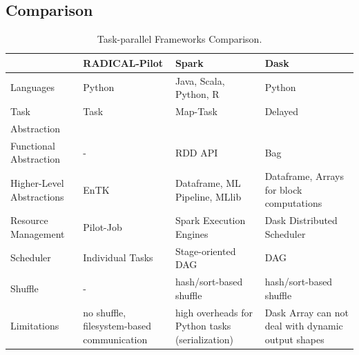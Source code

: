 
\subsection{Comparison}
\begin{table}[t]
    \begin{tabular}{@{}p{2.75cm}|p{3.25cm}p{3.25cm}p{3.25cm}@{}}
        \toprule
        &\textbf{RADICAL-Pilot} &
        \textbf{Spark} &
        \textbf{Dask} \\
        \midrule
        Languages &
        Python &
        Java, Scala, Python, R &
        Python\\
        Task &
        Task &
        Map-Task &
        Delayed\\
        Abstraction &
        &
        & \\
        Functional Abstraction  &
        - &
        RDD API &
        Bag\\
        Higher-Level Abstractions &
        EnTK~\cite{balasubramanian2018harnessing} &
        Dataframe, ML Pipeline, MLlib~\cite{meng2016mllib} &
        Dataframe, Arrays for block computations\\
        Resource Management &
        Pilot-Job &
        Spark Execution Engines &
        Dask Distributed Scheduler\\
        Scheduler    &
        Individual Tasks &
        Stage-oriented DAG &
        DAG\\
        Shuffle      &
        -       &
        hash/sort-based shuffle &
        hash/sort-based shuffle\\
        Limitations &
        no shuffle, filesystem-based communication  &
        high overheads for Python tasks (serialization)   &
        Dask Array can not deal with dynamic output shapes\\
        \bottomrule
    \end{tabular}
    \caption{Task-parallel Frameworks Comparison.\label{tab:frameworks}}
\end{table}

